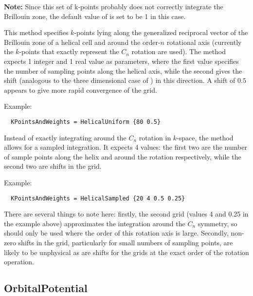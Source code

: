 \textbf{Note:} Since this set of k-points probably does not correctly integrate the Brillouin zone,
the default value of  is set to be 1 in this case.


This method specifies $k$-points lying along the generalized reciprocal vector
of the Brillouin zone of a helical cell and around the order-$n$ rotational axis
(currently the $k$-points that exactly represent the $C_n$ rotation are
used). The  method expects 1 integer and 1 real value as
parameters, where the first value specifies the number of sampling points along
the helical axis, while the second gives the shift (analogous to the three
dimensional case of ) in this direction. A shift of $0.5$
appears to give more rapid convergence of the grid.

Example:
\invparskip
\begin{verbatim}
  KPointsAndWeights = HelicalUniform {80 0.5}
\end{verbatim}


Instead of exactly integrating around the $C_n$ rotation in $k$-space, the
 method allows for a sampled integration. It expects 4
values: the first two are the number of sample points along the helix and around
the rotation respectively, while the second two are shifts in the grid.

Example:
\invparskip
\begin{verbatim}
  KPointsAndWeights = HelicalSampled {20 4 0.5 0.25}
\end{verbatim}

There are several things to note here: firstly, the second grid (values 4 and
0.25 in the example above) approximates the integration around the $C_n$
symmetry, so should only be used where the order of this rotation axis is
large. Secondly, non-zero shifts in the grid, particularly for small numbers of
sampling points, are likely to be unphysical as are shifts for the grids at the
exact order of the rotation operation.

\subsection{OrbitalPotential}
\label{sec:dftbp.OrbitalPotential}

\label{sec:DFTB+U}

